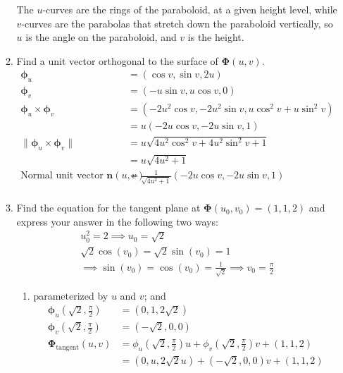 \documentclass{article}
\newcommand{\norm}[1]{\| #1 \|}
\begin{document}
\begin{enumerate}
\begin{enumerate}
        The $u$-curves are the rings of the paraboloid, at a given height level, while $v$-curves are the parabolas that stretch down the paraboloid vertically, so $u$ is the angle on the paraboloid, and $v$ is the height.
        \item Find a unit vector orthogonal to the surface of $\boldsymbol \Phi (u,v)$.
        \begin{align*}
            \boldsymbol \phi_u &= (\cos v, \sin v, 2u) \\
            \boldsymbol \phi_v &= (-u \sin v, u \cos v, 0) \\
            \boldsymbol \phi_u \times \boldsymbol \phi_v &= (-2u^2 \cos v, -2u^2 \sin v, u \cos^2 v + u \sin^2 v) \\
            &= u(-2u\cos v, -2u\sin v , 1) \\
            \norm{\boldsymbol \phi_u \times \boldsymbol \phi_v} &= u\sqrt{4u^2 \cos^2 v + 4u^2 \sin^2 v + 1} \\
            &= u\sqrt{4u^2 + 1} \\
            \text{Normal unit vector } \boldsymbol n(u,v) &= \frac{1}{\sqrt{4u^2 +1}}(-2u \cos v, -2u\sin v , 1) \\
        \end{align*}
        \item Find the equation for the tangent plane at $\boldsymbol \Phi(u_0,v_0) = (1,1,2)$ and express your answer in the following two ways:
        \begin{align*}
            u_0^2 = 2 \implies u_0 = \sqrt{2} \\
            \sqrt{2} \cos (v_0) = \sqrt{2} \sin (v_0) = 1 \\ 
            \implies \sin(v_0) = \cos(v_0) = \frac{1}{\sqrt{2}} \implies v_0 = \frac{\pi}{2}
        \end{align*} 
        \begin{enumerate}
            \item parameterized by $u$ and $v$; and
                \begin{align*}
                    \boldsymbol \phi_u(\sqrt2 , \frac{\pi}{2}) &= (0, 1, 2\sqrt{2}) \\
                    \boldsymbol \phi_v(\sqrt2 , \frac{\pi}{2}) &= (-\sqrt{2}, 0, 0) \\
                    \boldsymbol \Phi_{\text{tangent}} (u,v) &= \phi_u(\sqrt2 , \frac{\pi}{2})u + \phi_v(\sqrt2, \frac{\pi}{2})v + (1,1,2) \\
                    &= (0,u,2\sqrt2 u) + (-\sqrt2,0,0)v + (1,1,2) \\

\end{align*}
\end{enumerate}
\end{enumerate}
\end{enumerate}
\end{document}
